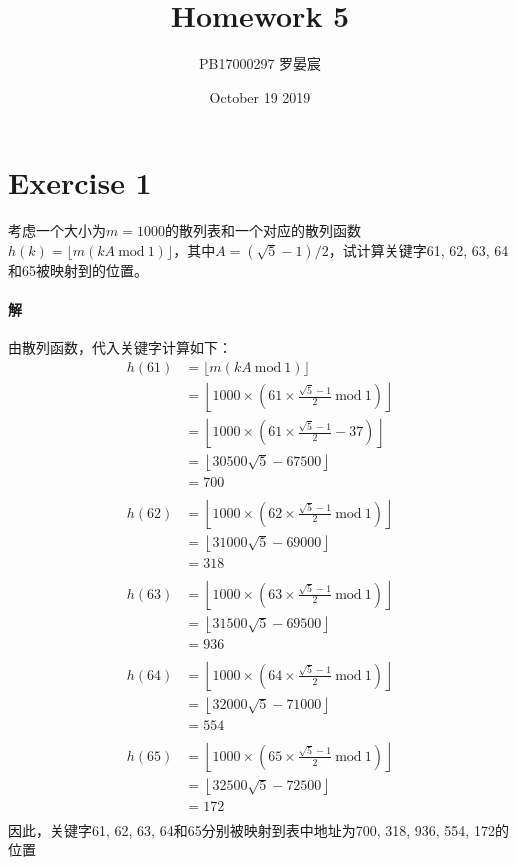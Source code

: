 \documentclass{article}
\title{Homework 5}
\author{PB17000297 罗晏宸}
\date{October 19 2019}
\begin{document}
\maketitle

\section*{Exercise 1}
考虑一个大小为$m = 1000$的散列表和一个对应的散列函数$h(k) = \lfloor m(kA\ \text{mod}\ 1) \rfloor$，其中$A = (\sqrt{5} − 1)/2$，试计算关键字61, 62, 63, 64和65被映射到的位置。
\paragraph{解}
由散列函数，代入关键字计算如下：
\begin{align*}
    h(61)
        &= \lfloor m(kA\ \text{mod}\ 1) \rfloor \\
        &= \left \lfloor 1000 \times \left(61 \times \frac{\sqrt{5}-1}{2} \ \text{mod}\ 1 \right) \right \rfloor \\
        &= \left \lfloor 1000 \times \left( 61 \times \frac{\sqrt{5}-1}{2} - 37 \right) \right \rfloor \\
        &= \left \lfloor 30500\sqrt{5} - 67500 \right \rfloor \\
        &= 700 \\
    \\
    h(62)
        &= \left \lfloor 1000 \times \left(62 \times \frac{\sqrt{5}-1}{2} \ \text{mod}\ 1 \right) \right \rfloor \\
        &= \left \lfloor 31000\sqrt{5} - 69000 \right \rfloor \\
        &= 318 \\
    \\
    h(63)
        &= \left \lfloor 1000 \times \left(63 \times \frac{\sqrt{5}-1}{2} \ \text{mod}\ 1 \right) \right \rfloor \\
        &= \left \lfloor 31500\sqrt{5} - 69500 \right \rfloor \\
        &= 936 \\
        \\
    h(64)
        &= \left \lfloor 1000 \times \left(64 \times \frac{\sqrt{5}-1}{2} \ \text{mod}\ 1 \right) \right \rfloor \\
        &= \left \lfloor 32000\sqrt{5} - 71000 \right \rfloor \\
        &= 554 \\
        \\
    h(65)
        &= \left \lfloor 1000 \times \left(65 \times \frac{\sqrt{5}-1}{2} \ \text{mod}\ 1 \right) \right \rfloor \\
        &= \left \lfloor 32500\sqrt{5} - 72500 \right \rfloor \\
        &= 172 \\
\end{align*}
因此，关键字61, 62, 63, 64和65分别被映射到表中地址为700, 318, 936, 554, 172的位置
\end{document}
